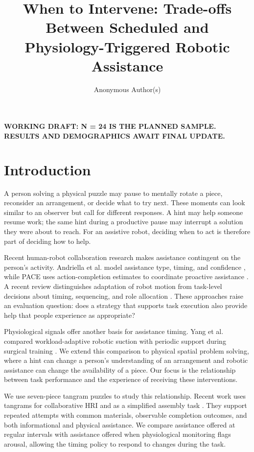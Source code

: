 \documentclass[sigconf,anonymous]{aamas}
\title{When to Intervene: Trade-offs Between Scheduled and Physiology-Triggered Robotic Assistance}
\author{Anonymous Author(s)}
\begin{document}
\maketitle

\noindent\textbf{WORKING DRAFT: N = 24 IS THE PLANNED SAMPLE. RESULTS AND DEMOGRAPHICS AWAIT FINAL UPDATE.}

\section{Introduction}

A person solving a physical puzzle may pause to mentally rotate a piece, reconsider an arrangement, or decide what to try next. These moments can look similar to an observer but call for different responses. A hint may help someone resume work; the same hint during a productive pause may interrupt a solution they were about to reach. For an assistive robot, deciding when to act is therefore part of deciding how to help.

Recent human-robot collaboration research makes assistance contingent on the person's activity. Andriella et al. model assistance type, timing, and confidence \cite{andriella2025}, while PACE uses action-completion estimates to coordinate proactive assistance \cite{delazzari2025}. A recent review distinguishes adaptation of robot motion from task-level decisions about timing, sequencing, and role allocation \cite{karbouj2026}. These approaches raise an evaluation question: does a strategy that supports task execution also provide help that people experience as appropriate?

Physiological signals offer another basis for assistance timing. Yang et al. compared workload-adaptive robotic suction with periodic support during surgical training \cite{yang2024}. We extend this comparison to physical spatial problem solving, where a hint can change a person's understanding of an arrangement and robotic assistance can change the availability of a piece. Our focus is the relationship between task performance and the experience of receiving these interventions.

We use seven-piece tangram puzzles to study this relationship. Recent work uses tangrams for collaborative HRI and as a simplified assembly task \cite{tabatabaei2025,melo2026}. They support repeated attempts with common materials, observable completion outcomes, and both informational and physical assistance. We compare assistance offered at regular intervals with assistance offered when physiological monitoring flags arousal, allowing the timing policy to respond to changes during the task.
\end{document}
